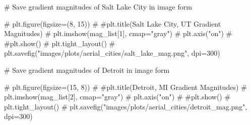 \documentclass[
  letterpaper,
  DIV=11,
  numbers=noendperiod]{scrreprt}
\newenvironment{Shaded}{\begin{snugshade}}{\end{snugshade}}
\newcommand{\CommentTok}[1]{\textcolor[rgb]{0.37,0.37,0.37}{#1}}
\begin{document}
\begin{Shaded}
\begin{Highlighting}[]
\CommentTok{\# Save gradient magnitudes of Salt Lake City in image form}

\CommentTok{\# plt.figure(figsize=(8, 15))}
\CommentTok{\# \#plt.title(\textquotesingle{}Salt Lake City, UT Gradient Magnitudes\textquotesingle{})}
\CommentTok{\# plt.imshow(mag\_list[1], cmap="gray")}
\CommentTok{\# plt.axis("on")}
\CommentTok{\# \#plt.show()}
\CommentTok{\# plt.tight\_layout()}
\CommentTok{\# plt.savefig("images/plots/aerial\_cities/salt\_lake\_mag.png", dpi=300)}
\end{Highlighting}
\end{Shaded}

\begin{Shaded}
\begin{Highlighting}[]
\CommentTok{\# Save gradient magnitudes of Detroit in image form}

\CommentTok{\# plt.figure(figsize=(15, 8))}
\CommentTok{\# \#plt.title(\textquotesingle{}Detroit, MI Gradient Magnitudes\textquotesingle{})}
\CommentTok{\# plt.imshow(mag\_list[2], cmap="gray")}
\CommentTok{\# plt.axis("on")}
\CommentTok{\# \#plt.show()}
\CommentTok{\# plt.tight\_layout()}
\CommentTok{\# plt.savefig("images/plots/aerial\_cities/detroit\_mag.png", dpi=300)}
\end{Highlighting}
\end{Shaded}
\end{document}
